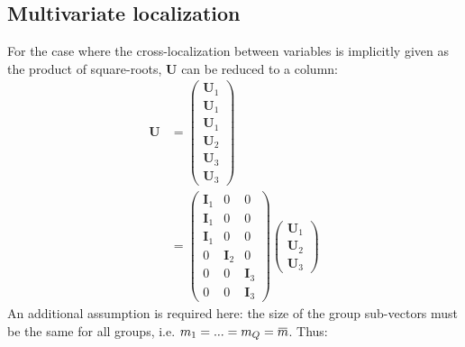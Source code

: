 \documentclass[12pt]{scrartcl}
\newcommand{\overbar}[1]{\mkern 1.5mu\overline{\mkern-1.5mu#1\mkern-1.5mu}\mkern 1.5mu}
\begin{document}
\subsection{Multivariate localization}
For the case where the cross-localization between variables is implicitly given as the product of square-roots, $\mathbf{U}$ can be reduced to a column:
\begin{align}
\mathbf{U} & = \left( \begin{array}{c}
\mathbf{U}_1 \\
\mathbf{U}_1 \\
\mathbf{U}_1 \\[0.3ex]
\hline
\mathbf{U}_2 \\[0.3ex]
\hline
\mathbf{U}_3 \\
\mathbf{U}_3
\end{array} \right) \nonumber \\
& = \left( \begin{array}{c|c|c}
\mathbf{I}_1 & 0 & 0 \\
\mathbf{I}_1 & 0 & 0 \\
\mathbf{I}_1 & 0 & 0 \\[0.3ex]
\hline
0 & \mathbf{I}_2 & 0 \\[0.3ex]
\hline
0 & 0 & \mathbf{I}_3 \\
0 & 0 & \mathbf{I}_3
\end{array} \right)
\left( \begin{array}{c}
\mathbf{U}_1 \\[0.3ex]
\hline
\mathbf{U}_2 \\[0.3ex]
\hline
\mathbf{U}_3
\end{array} \right)
\end{align}
An additional assumption is required here: the size of the group sub-vectors must be the same for all groups, i.e. $m_1 = ... = m_Q = \overbar{m}$. Thus:
\end{document}
